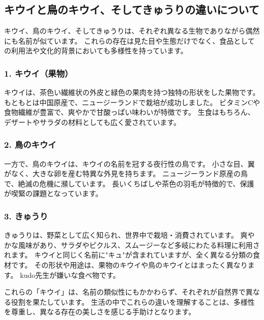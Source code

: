 \chapter{}\label{chap:appendixB}
\vspace{20mm}\hrulefill\\\vspace{20mm}

\section{キウイと鳥のキウイ、そしてきゅうりの違いについて}

キウイ、鳥のキウイ、そしてきゅうりは、それぞれ異なる生物でありながら偶然にも名前が似ています。
これらの存在は見た目や生態だけでなく、食品としての利用法や文化的背景においても多様性を持っています。

\subsection{1. キウイ（果物）}

キウイは、茶色い繊維状の外皮と緑色の果肉を持つ独特の形状をした果物です。
もともとは中国原産で、ニュージーランドで栽培が成功しました。
ビタミンCや食物繊維が豊富で、爽やかで甘酸っぱい味わいが特徴です。
生食はもちろん、デザートやサラダの材料としても広く愛されています。

\subsection{2. 鳥のキウイ}

一方で、鳥のキウイは、キウイの名前を冠する夜行性の鳥です。
小さな目、翼がなく、大きな卵を産む特異な外見を持ちます。
ニュージーランド原産の鳥で、絶滅の危機に瀕しています。
長いくちばしや茶色の羽毛が特徴的で、保護が喫緊の課題となっています。

\subsection{3. きゅうり}

きゅうりは、野菜として広く知られ、世界中で栽培・消費されています。
爽やかな風味があり、サラダやピクルス、スムージーなど多岐にわたる料理に利用されます。
キウイと同じく名前に"キュ"が含まれていますが、全く異なる分類の食材です。
その形状や用途は、果物のキウイや鳥のキウイとはまったく異なります。
kudo先生が嫌いな食べ物です。

これらの「キウイ」は、名前の類似性にもかかわらず、それぞれが自然界で異なる役割を果たしています。
生活の中でこれらの違いを理解することは、多様性を尊重し、異なる存在の美しさを感じる手助けとなります。
